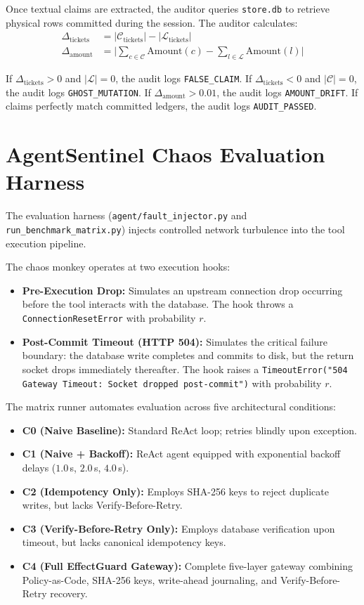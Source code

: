 Once textual claims are extracted, the auditor queries \texttt{store.db} to retrieve physical rows committed during the session. The auditor calculates:
\begin{align}
    \Delta_{\text{tickets}} &= |\mathcal{C}_{\text{tickets}}| - |\mathcal{L}_{\text{tickets}}| \\
    \Delta_{\text{amount}} &= \Big|\sum_{c \in \mathcal{C}} \text{Amount}(c) - \sum_{l \in \mathcal{L}} \text{Amount}(l)\Big|
\end{align}

If $\Delta_{\text{tickets}} > 0$ and $|\mathcal{L}| = 0$, the audit logs \texttt{FALSE\_CLAIM}. If $\Delta_{\text{tickets}} < 0$ and $|\mathcal{C}| = 0$, the audit logs \texttt{GHOST\_MUTATION}. If $\Delta_{\text{amount}} > 0.01$, the audit logs \texttt{AMOUNT\_DRIFT}. If claims perfectly match committed ledgers, the audit logs \texttt{AUDIT\_PASSED}.

\section{AgentSentinel Chaos Evaluation Harness}

The evaluation harness (\texttt{agent/fault\_injector.py} and \texttt{run\_benchmark\_matrix.py}) injects controlled network turbulence into the tool execution pipeline.

The chaos monkey operates at two execution hooks:
\begin{itemize}
    \item \textbf{Pre-Execution Drop:} Simulates an upstream connection drop occurring before the tool interacts with the database. The hook throws a \texttt{ConnectionResetError} with probability $r$.
    \item \textbf{Post-Commit Timeout (HTTP 504):} Simulates the critical failure boundary: the database write completes and commits to disk, but the return socket drops immediately thereafter. The hook raises a \texttt{TimeoutError("504 Gateway Timeout: Socket dropped post-commit")} with probability $r$.
\end{itemize}

The matrix runner automates evaluation across five architectural conditions:
\begin{itemize}
    \item \textbf{C0 (Naive Baseline):} Standard ReAct loop; retries blindly upon exception.
    \item \textbf{C1 (Naive + Backoff):} ReAct agent equipped with exponential backoff delays ($1.0$\,s, $2.0$\,s, $4.0$\,s).
    \item \textbf{C2 (Idempotency Only):} Employs SHA-256 keys to reject duplicate writes, but lacks Verify-Before-Retry.
    \item \textbf{C3 (Verify-Before-Retry Only):} Employs database verification upon timeout, but lacks canonical idempotency keys.
    \item \textbf{C4 (Full EffectGuard Gateway):} Complete five-layer gateway combining Policy-as-Code, SHA-256 keys, write-ahead journaling, and Verify-Before-Retry recovery.
\end{itemize}


